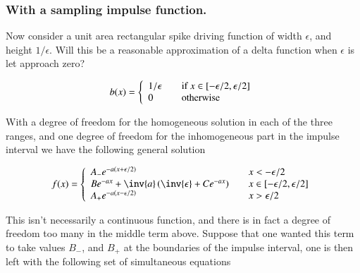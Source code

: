 \subsubsection{With a sampling impulse function. }

Now consider a unit area rectangular spike driving function of width $\epsilon$, and height $1/\epsilon$.  Will this be a reasonable approximation of a delta function
when $\epsilon$ is let approach zero?

\begin{align*}
b(x) = 
\left\{
\begin{array}{l l}
1/{\epsilon} & \quad \mbox{if $x \in \left[-\epsilon/2, \epsilon/2 \right]$} \\
0              & \quad \mbox{otherwise}
\end{array} \right.
\end{align*}

With a degree of freedom for the homogeneous solution in each of the three ranges, and one degree of freedom for the inhomogeneous part in the impulse interval we have the following general solution

\begin{align*}
f(x) = 
\left\{
\begin{array}{l l}
A_{-} e^{-a(x + \epsilon/2)} & \quad x < -\epsilon/2 \\
B e^{-ax} + \inv{a}\left(\inv{\epsilon} + C e^{-a x}\right)& \quad x \in \left[-\epsilon/2, \epsilon/2 \right] \\
A_{+} e^{-a(x - \epsilon/2)} & \quad x > \epsilon/2 \\
\end{array} \right.
\end{align*}


This isn't necessarily a continuous function, and there is in fact a degree of freedom too many in the middle term above.  Suppose that one wanted this term
to take values $B_{-}$, and $B_{+}$ at the boundaries of the impulse interval, one is then left with the following set of simultaneous equations

